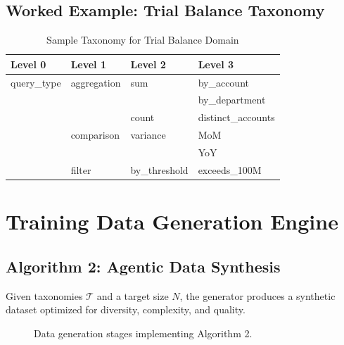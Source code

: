 \documentclass[12pt,a4paper,twoside]{report}
\begin{document}
\section{Worked Example: Trial Balance Taxonomy}

\begin{table}[H]
\centering
\caption{Sample Taxonomy for Trial Balance Domain}
\label{tab:tb-taxonomy}
\begin{tabular}{llll}
\toprule
\textbf{Level 0} & \textbf{Level 1} & \textbf{Level 2} & \textbf{Level 3} \\
\midrule
query\_type & aggregation & sum & by\_account \\
&             &     & by\_department \\
&             & count & distinct\_accounts \\
& comparison & variance & MoM \\
&            &          & YoY \\
& filter & by\_threshold & exceeds\_100M \\
\bottomrule
\end{tabular}
\end{table}

\newpage
\chapter{Training Data Generation Engine}
\label{chap:generator}

\section{Algorithm 2: Agentic Data Synthesis}

Given taxonomies $\mathcal{T}$ and a target size $N$, the generator produces a synthetic
dataset optimized for diversity, complexity, and quality.

\begin{figure}[H]
\centering
{}
\caption{Data generation stages implementing Algorithm 2.}
\label{fig:generator-stages}
\end{figure}
\end{document}
